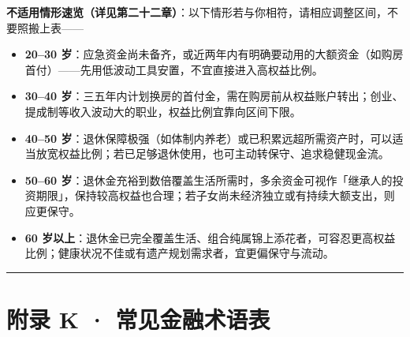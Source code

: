 \documentclass[a4paper,11pt,oneside,fontset=none,UTF8,zihao=-4]{ctexbook}
\providecommand{\tightlist}{\setlength{\itemsep}{2pt}\setlength{\parskip}{1pt}}
\begin{document}
\begin{dhquote}
\textbf{不适用情形速览（详见第二十二章）}：以下情形若与你相符，请相应调整区间，不要照搬上表------

\begin{itemize}
\tightlist
\item
  \textbf{20--30
  岁}：应急资金尚未备齐，或近两年内有明确要动用的大额资金（如购房首付）------先用低波动工具安置，不宜直接进入高权益比例。
\item
  \textbf{30--40
  岁}：三五年内计划换房的首付金，需在购房前从权益账户转出；创业、提成制等收入波动大的职业，权益比例宜靠向区间下限。
\item
  \textbf{40--50
  岁}：退休保障极强（如体制内养老）或已积累远超所需资产时，可以适当放宽权益比例；若已足够退休使用，也可主动转保守、追求稳健现金流。
\item
  \textbf{50--60
  岁}：退休金充裕到数倍覆盖生活所需时，多余资金可视作「继承人的投资期限」，保持较高权益也合理；若子女尚未经济独立或有持续大额支出，则应更保守。
\item
  \textbf{60
  岁以上}：退休金已完全覆盖生活、组合纯属锦上添花者，可容忍更高权益比例；健康状况不佳或有遗产规划需求者，宜更偏保守与流动。
\end{itemize}
\end{dhquote}

\begin{center}{\color{dh-bronze}\rule{0.2\textwidth}{0.5pt}}\end{center}

\section{附录 K ·
常见金融术语表}\label{ux9644ux5f55-k-ux5e38ux89c1ux91d1ux878dux672fux8bedux8868}
\end{document}
